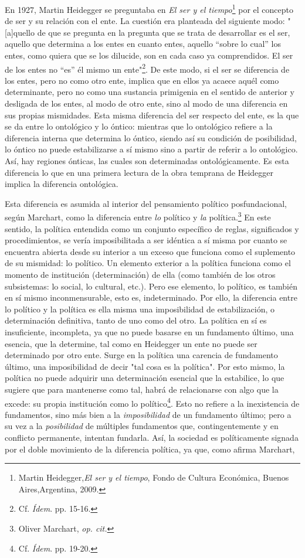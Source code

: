 En 1927, Martin Heidegger se preguntaba en \emph{El ser y el
tiempo}\footnote{Martin Heidegger,\emph{El ser y el tiempo}, Fondo de
  Cultura Económica, Buenos Aires,Argentina, 2009.} por el concepto de
ser y su relación con el ente. La cuestión era planteada del siguiente
modo: "{[}a{]}quello de que se pregunta en la pregunta que se trata de
desarrollar es el ser, aquello que determina a los entes en cuanto
entes, aquello ``sobre lo cual'' los entes, como quiera que se los
dilucide, son en cada caso ya comprendidos. El ser de los entes no
``es'' él mismo un ente"\footnote{Cf. \emph{Ídem}. pp. 15-16.}. De este
modo, si el ser se diferencia de los entes, pero no como otro ente,
implica que en ellos ya acaece aquél como determinante, pero no como una
sustancia primigenia en el sentido de anterior y desligada de los entes,
al modo de otro ente, sino al modo de una diferencia en sus propias
mismidades. Esta misma diferencia del ser respecto del ente, es la que
se da entre lo ontológico y lo óntico: mientras que lo ontológico
refiere a la diferencia interna que determina lo óntico, siendo así su
condición de posibilidad, lo óntico no puede estabilizarse a sí mismo
sino a partir de referir a lo ontológico. Así, hay regiones ónticas, las
cuales son determinadas ontológicamente. Es esta diferencia lo que en
una primera lectura de la obra temprana de Heidegger implica la
diferencia ontológica.

Esta diferencia es asumida al interior del pensamiento político
posfundacional, según Marchart, como la diferencia entre \emph{lo}
político y \emph{la} política.\footnote{Oliver Marchart, \emph{op. cit.}}
En este sentido, la política entendida como un conjunto específico de
reglas, significados y procedimientos, se vería imposibilitada a ser
idéntica a sí misma por cuanto se encuentra abierta desde su interior a
un exceso que funciona como el suplemento de su mismidad: lo político.
Un elemento exterior a la política funciona como el momento de
institución (determinación) de ella (como también de los otros
subsistemas: lo social, lo cultural, etc.). Pero ese elemento, lo
político, es también en sí mismo inconmensurable, esto es,
indeterminado. Por ello, la diferencia entre lo político y la política
es ella misma una imposibilidad de estabilización, o determinación
definitiva, tanto de uno como del otro. La política en sí es
insuficiente, incompleta, ya que no puede basarse en un fundamento
último, una esencia, que la determine, tal como en Heidegger un ente no
puede ser determinado por otro ente. Surge en la política una carencia
de fundamento último, una imposibilidad de decir "tal cosa es la
política". Por esto mismo, la política no puede adquirir una
determinación esencial que la estabilice, lo que sugiere que para
mantenerse como tal, habrá de relacionarse con algo que la excede: su
propia institución como lo político\footnote{Cf. \emph{Ídem}. pp. 19-20.}.
Esto no refiere a la inexistencia de fundamentos, sino más bien a la
\emph{imposibilidad} de un fundamento último; pero a su vez a la
\emph{posibilidad} de múltiples fundamentos que, contingentemente y en
conflicto permanente, intentan fundarla. Así, la sociedad es
políticamente signada por el doble movimiento de la diferencia política,
ya que, como afirma Marchart,

